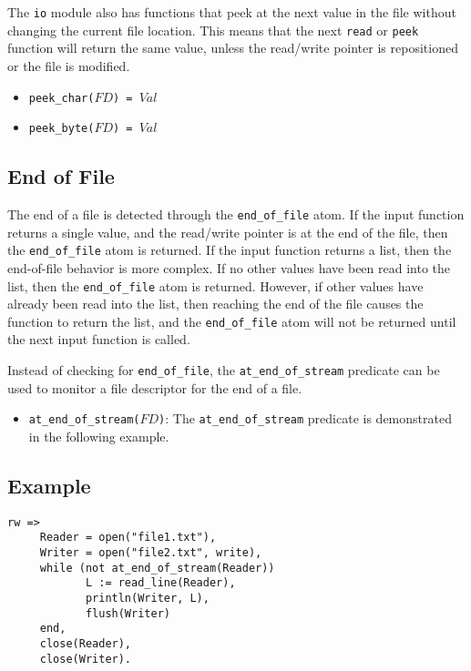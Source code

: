 The \texttt{io} module also has functions that peek at the next value in the file without changing the current file location.  This means that the next \texttt{read} or \texttt{peek} function will return the same value, unless the read/write pointer is repositioned or the file is modified.

\begin{itemize}
\item \texttt{peek\_char($FD$) = $Val$}
\item \texttt{peek\_byte($FD$) = $Val$}
\end{itemize}

\subsection{End of File}
The end of a file is detected through the \texttt{end\_of\_file} atom.  If the input function returns a single value, and the read/write pointer is at the end of the file, then the \texttt{end\_of\_file} atom is returned.  If the input function returns a list, then the end-of-file behavior is more complex.   If no other values have been read into the list, then the \texttt{end\_of\_file} atom is returned.  However, if other values have already been read into the list, then reaching the end of the file causes the function to return the list, and the \texttt{end\_of\_file} atom will not be returned until the next input function is called.

Instead of checking for \texttt{end\_of\_file}, the \texttt{at\_end\_of\_stream} predicate can be used to monitor a file descriptor for the end of a file.

\begin{itemize}
\item \texttt{at\_end\_of\_stream($FD$)}: The \texttt{at\_end\_of\_stream} predicate is demonstrated in the following example. 
\end{itemize}

\subsection*{Example}
\begin{verbatim}
rw =>
     Reader = open("file1.txt"),
     Writer = open("file2.txt", write),
     while (not at_end_of_stream(Reader))
            L := read_line(Reader),
            println(Writer, L),
            flush(Writer)
     end,
     close(Reader),
     close(Writer).
\end{verbatim}

